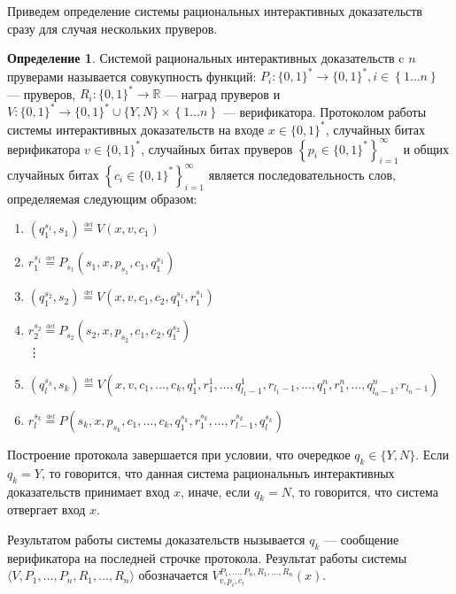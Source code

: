\documentclass{mipt-thesis-bs}
\theoremstyle{plain}
\theoremstyle{definition}
\newtheorem{definition}{Определение}
\newcommand{\word}{\{0, 1\}^*}
\newcommand{\defeq}{\overset{\underset{\mathrm{def}}{}}{=}}
\newcommand{\set}[1]{\left\{#1\right\}}
\begin{document}
Приведем определение системы рациональных интерактивных доказательств сразу для случая нескольких пруверов.
\begin{definition}
    Системой рациональных интерактивных доказательств c $n$ пруверами называется совукупность функций: $P_i: \word \longrightarrow \word, i \in \set{1\ldots n}$ --- пруверов, $R_i: \word \longrightarrow \mathbb{R}$ --- наград пруверов и $V: \word \longrightarrow \word \cup \{Y, N\} \times \set{1 \dots n}$ --- верификатора. Протоколом работы системы интерактивных доказательств на входе $x \in \word$, случайных битах верификатора $v \in \word$, случайных битах пруверов $\left\{p_i\in \word\right\}_{i=1}^{\infty}$ и общих случайных битах $\left\{c_i\in \word\right\}_{i=1}^{\infty}$ является последовательность слов, определяемая следующим образом:
    \begin{enumerate}
        \item $(q^{s_1}_1, s_1) \defeq V(x, v, c_1)$
        \item $r^{s_1}_1 \defeq P_{s_1}(s_1, x, p_{s_1}, c_1, q^{s_1}_1)$
        \item $(q^{s_2}_1, s_2) \defeq V(x, v, c_1, c_2, q^{s_1}_1, r^{s_1}_1)$
        \item $r^{s_2}_2 \defeq P_{s_2}(s_2, x, p_{s_2}, c_1, c_2, q^{s_2}_1)$\\
            \vdots
        \item $(q^{s_k}_l, s_k) \defeq V(x, v, c_1, \ldots, c_k, q^1_1, r^1_1, \ldots, q^1_{l_1-1}, r_{l_1-1}, \ldots, q^n_1, r^n_1, \ldots, q^n_{l_n-1}, r_{l_n-1})$
        \item $r^{s_k}_l \defeq P(s_k, x, p_{s_k}, c_1, \ldots, c_k, q^{s_k}_1, r^{s_k}_1, \ldots, r^{s_k}_{l-1}, q^{s_k}_l)$
    \end{enumerate}
    Построение протокола завершается при условии, что очередкое $q_k \in \{Y, N\}$. Если $q_k = Y$, то говорится, что данная система рациональныъ интерактивных доказательств принимает вход $x$, иначе, если $q_k = N$, то говорится, что система отвергает вход $x$.

Результатом работы системы доказательств нызывается $q_k$ --- сообщение верификатора на последней строчке протокола. Результат работы системы $\langle V, P_1, \ldots, P_n, R_1, \ldots, R_n\rangle$ обозначается $V^{P_1, \ldots, P_n, R_1, \ldots, R_n}_{v, p_i, c_i}(x)$.
\end{definition}
\end{document}
